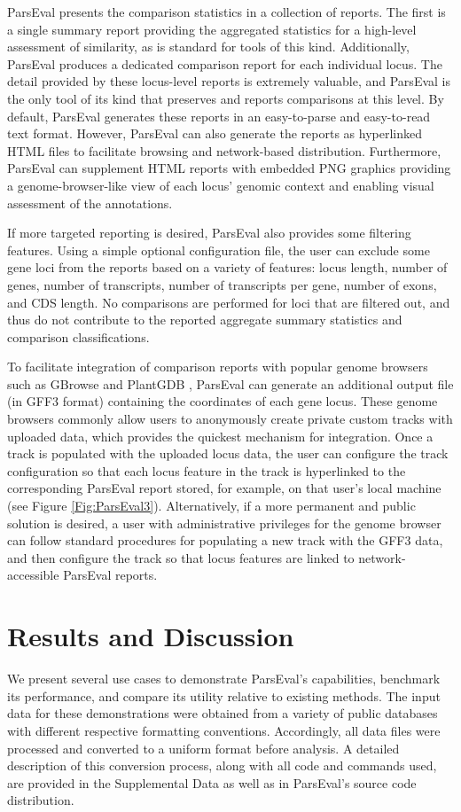 ParsEval presents the comparison statistics in a collection of reports.
The first is a single summary report providing the aggregated statistics for a high-level assessment of similarity, as is standard for tools of this kind.
Additionally, ParsEval produces a dedicated comparison report for each individual locus.
The detail provided by these locus-level reports is extremely valuable, and ParsEval is the only tool of its kind that preserves and reports comparisons at this level.
By default, ParsEval generates these reports in an easy-to-parse and easy-to-read text format.
However, ParsEval can also generate the reports as hyperlinked HTML files to facilitate browsing and network-based distribution.
Furthermore, ParsEval can supplement HTML reports with embedded PNG graphics providing a genome-browser-like view of each locus' genomic context and enabling visual assessment of the annotations.

If more targeted reporting is desired, ParsEval also provides some filtering features.
Using a simple optional configuration file, the user can exclude some gene loci from the reports based on a variety of features: locus length, number of genes, number of transcripts, number of transcripts per gene, number of exons, and CDS length.
No comparisons are performed for loci that are filtered out, and thus do not contribute to the reported aggregate summary statistics and comparison classifications.

To facilitate integration of comparison reports with popular genome browsers such as GBrowse \citep{GBrowse} and PlantGDB \citep{Duvick}, ParsEval can generate an additional output file (in GFF3 format) containing the coordinates of each gene locus.
These genome browsers commonly allow users to anonymously create private custom tracks with uploaded data, which provides the quickest mechanism for integration.
Once a track is populated with the uploaded locus data, the user can configure the track configuration so that each locus feature in the track is hyperlinked to the corresponding ParsEval report stored, for example, on that user's local machine (see Figure \ref{Fig:ParsEval3}).
Alternatively, if a more permanent and public solution is desired, a user with administrative privileges for the genome browser can follow standard procedures for populating a new track with the GFF3 data, and then configure the track so that locus features are linked to network-accessible ParsEval reports.


\section{Results and Discussion}
We present several use cases to demonstrate ParsEval's capabilities, benchmark its performance, and compare its utility relative to existing methods.
The input data for these demonstrations were obtained from a variety of public databases with different respective formatting conventions.
Accordingly, all data files were processed and converted to a uniform format before analysis.
A detailed description of this conversion process, along with all code and commands used, are provided in the Supplemental Data as well as in ParsEval's source code distribution.


